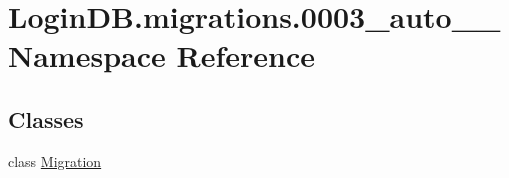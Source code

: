 \hypertarget{namespace_login_d_b_1_1migrations_1_10003__auto__20201206__1720}{}\section{Login\+D\+B.\+migrations.0003\+\_\+auto\+\_\+\_ Namespace Reference}
\label{namespace_login_d_b_1_1migrations_1_10003__auto__20201206__1720}
\subsection*{Classes}
\begin{DoxyCompactItemize}
\item 
class \hyperlink{class_login_d_b_1_1migrations_1_10003__auto__20201206__1720_1_1_migration}{Migration}
\end{DoxyCompactItemize}
